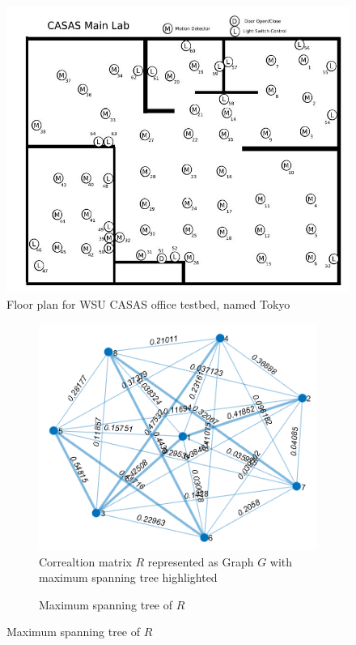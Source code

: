 \begin{figure}
\includegraphics[scale=0.5]{./pics/LabSensorsLayout.jpg}
\centering
\caption{Floor plan for WSU CASAS office testbed, named Tokyo}
\label{fig:casas}
\end{figure}

\begin{figure}
\begin{subfigure}[b]{0.4\textwidth}
\includegraphics[scale=0.5]{./pics/corrTree.jpg}
\centering
\caption{Correaltion matrix $R$ represented as Graph $G$ with maximum spanning tree highlighted}
\label{fig:corrMatTree}
\end{subfigure}
\hfill
\begin{subfigure}[b]{0.4\textwidth}
\caption{Maximum spanning tree of $R$}
\label{fig:corrMST}
\end{subfigure}
\end{figure}

